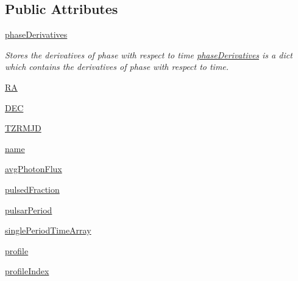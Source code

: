 \subsection*{Public Attributes}
\begin{DoxyCompactItemize}
\item 
\hyperlink{classmodest_1_1signals_1_1poissonsource_1_1PeriodicPoissonSource_ae30b60a8e1f92e1172041cd1fd267df8}{phase\+Derivatives}
\begin{DoxyCompactList}\small\item\em Stores the derivatives of phase with respect to time  \hyperlink{classmodest_1_1signals_1_1poissonsource_1_1PeriodicPoissonSource_ae30b60a8e1f92e1172041cd1fd267df8}{phase\+Derivatives} is a dict which contains the derivatives of phase with respect to time. \end{DoxyCompactList}\item 
\hyperlink{classmodest_1_1signals_1_1poissonsource_1_1PeriodicPoissonSource_a90c55d8278f10578bea87ea3547d08df}{RA}
\item 
\hyperlink{classmodest_1_1signals_1_1poissonsource_1_1PeriodicPoissonSource_a95791605e905e3f7af360d500e23e6a8}{D\+EC}
\item 
\hyperlink{classmodest_1_1signals_1_1poissonsource_1_1PeriodicPoissonSource_a98bc97a480e5b3f11c337644ad409b4c}{T\+Z\+R\+M\+JD}
\item 
\hyperlink{classmodest_1_1signals_1_1poissonsource_1_1PeriodicPoissonSource_a98cec694ca2d85c09b1f0c4d93081384}{name}
\item 
\hyperlink{classmodest_1_1signals_1_1poissonsource_1_1PeriodicPoissonSource_a79f9634be78f18e34daa792eb4742944}{avg\+Photon\+Flux}
\item 
\hyperlink{classmodest_1_1signals_1_1poissonsource_1_1PeriodicPoissonSource_adf39e84e02a1f4c98f4850853bca4d87}{pulsed\+Fraction}
\item 
\hyperlink{classmodest_1_1signals_1_1poissonsource_1_1PeriodicPoissonSource_a602c543f1a87a280ea021748fb2d8b84}{pulsar\+Period}
\item 
\hyperlink{classmodest_1_1signals_1_1poissonsource_1_1PeriodicPoissonSource_a0a4a43615a7ba6ad5952ec1f68833b2c}{single\+Period\+Time\+Array}
\item 
\hyperlink{classmodest_1_1signals_1_1poissonsource_1_1PeriodicPoissonSource_af057537ab956e1eb3bbeadd90bbe0aa9}{profile}
\item 
\hyperlink{classmodest_1_1signals_1_1poissonsource_1_1PeriodicPoissonSource_a61c32fbdb323e66149905e46b70a0e4c}{profile\+Index}
\item 

\end{DoxyCompactItemize}
